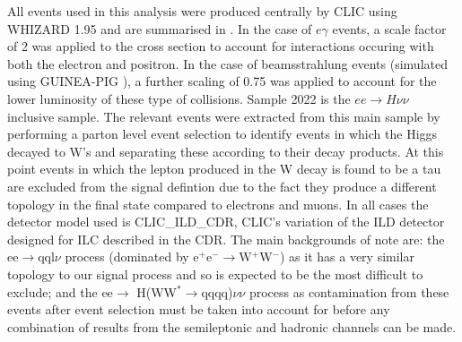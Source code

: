All events used in this analysis were produced centrally by \ac{CLIC} using WHIZARD 1.95 \cite{Kilian:2007gr} and are summarised in . In the case of $e\gamma$ events, a scale factor of 2 was applied to the cross section to account for interactions occuring with both the electron and positron. In the case of beamsstrahlung events (simulated using GUINEA-PIG \cite{Schulte:382453}), a further scaling of 0.75 was applied to account for the lower luminosity of these type of collisions. Sample 2022 is the $ee\rightarrow H\nu\nu$ inclusive sample. The relevant events were extracted from this main sample by performing a parton level event selection to identify events in which the Higgs decayed to W's and separating these according to their decay products. At this point events in which the lepton produced in the W decay is found to be a tau are excluded from the signal defintion due to the fact they produce a different topology in the final state compared to electrons and muons. In all cases the detector model used is CLIC\_ILD\_CDR, CLIC's variation of the ILD detector designed for ILC described in the CDR\cite{CDR}. The main backgrounds of note are: the ee$\rightarrow$qql$\nu$ process (dominated by e$^+$e$^-\rightarrow$W$^+$W$^-$) as it has a very similar topology to our signal process and so is expected to be the most difficult to exclude; and the ee$\rightarrow$ H(WW$^*\rightarrow$qqqq)$\nu\nu$ process as contamination from these events after event selection must be taken into account for before any combination of results from the semileptonic and hadronic channels can be made.


